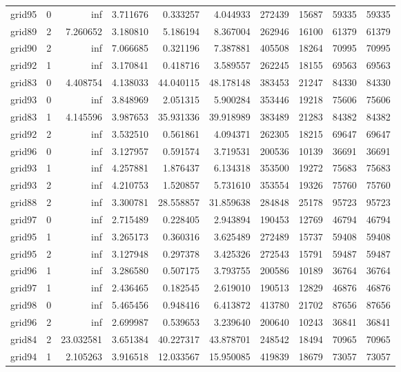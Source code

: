 \begin{longtable}{|l|r|r|r|r|r|r|r|r|r|}
grid95 & 0 & inf & 3.711676 & 0.333257 & 4.044933 & 272439 & 15687 & 59335 & 59335 \\
grid89 & 2 & 7.260652 & 3.180810 & 5.186194 & 8.367004 & 262946 & 16100 & 61379 & 61379 \\
grid90 & 2 & inf & 7.066685 & 0.321196 & 7.387881 & 405508 & 18264 & 70995 & 70995 \\
grid92 & 1 & inf & 3.170841 & 0.418716 & 3.589557 & 262245 & 18155 & 69563 & 69563 \\
grid83 & 0 & 4.408754 & 4.138033 & 44.040115 & 48.178148 & 383453 & 21247 & 84330 & 84330 \\
grid93 & 0 & inf & 3.848969 & 2.051315 & 5.900284 & 353446 & 19218 & 75606 & 75606 \\
grid83 & 1 & 4.145596 & 3.987653 & 35.931336 & 39.918989 & 383489 & 21283 & 84382 & 84382 \\
grid92 & 2 & inf & 3.532510 & 0.561861 & 4.094371 & 262305 & 18215 & 69647 & 69647 \\
grid96 & 0 & inf & 3.127957 & 0.591574 & 3.719531 & 200536 & 10139 & 36691 & 36691 \\
grid93 & 1 & inf & 4.257881 & 1.876437 & 6.134318 & 353500 & 19272 & 75683 & 75683 \\
grid93 & 2 & inf & 4.210753 & 1.520857 & 5.731610 & 353554 & 19326 & 75760 & 75760 \\
grid88 & 2 & inf & 3.300781 & 28.558857 & 31.859638 & 284848 & 25178 & 95723 & 95723 \\
grid97 & 0 & inf & 2.715489 & 0.228405 & 2.943894 & 190453 & 12769 & 46794 & 46794 \\
grid95 & 1 & inf & 3.265173 & 0.360316 & 3.625489 & 272489 & 15737 & 59408 & 59408 \\
grid95 & 2 & inf & 3.127948 & 0.297378 & 3.425326 & 272543 & 15791 & 59487 & 59487 \\
grid96 & 1 & inf & 3.286580 & 0.507175 & 3.793755 & 200586 & 10189 & 36764 & 36764 \\
grid97 & 1 & inf & 2.436465 & 0.182545 & 2.619010 & 190513 & 12829 & 46876 & 46876 \\
grid98 & 0 & inf & 5.465456 & 0.948416 & 6.413872 & 413780 & 21702 & 87656 & 87656 \\
grid96 & 2 & inf & 2.699987 & 0.539653 & 3.239640 & 200640 & 10243 & 36841 & 36841 \\
grid84 & 2 & 23.032581 & 3.651384 & 40.227317 & 43.878701 & 248542 & 18494 & 70965 & 70965 \\
grid94 & 1 & 2.105263 & 3.916518 & 12.033567 & 15.950085 & 419839 & 18679 & 73057 & 73057 \\

\end{longtable}
